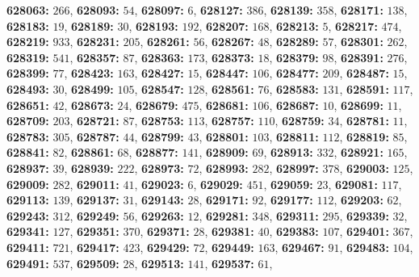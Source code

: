 \textsf{\bfseries 628063:} $266$, \textsf{\bfseries 628093:} $54$, \textsf{\bfseries 628097:} $6$, \textsf{\bfseries 628127:} $386$, \textsf{\bfseries 628139:} $358$, \textsf{\bfseries 628171:} $138$, \textsf{\bfseries 628183:} $19$, \textsf{\bfseries 628189:} $30$, \textsf{\bfseries 628193:} $192$, \textsf{\bfseries 628207:} $168$, \textsf{\bfseries 628213:} $5$, \textsf{\bfseries 628217:} $474$, \textsf{\bfseries 628219:} $933$, \textsf{\bfseries 628231:} $205$, \textsf{\bfseries 628261:} $56$, \textsf{\bfseries 628267:} $48$, \textsf{\bfseries 628289:} $57$, \textsf{\bfseries 628301:} $262$, \textsf{\bfseries 628319:} $541$, \textsf{\bfseries 628357:} $87$, \textsf{\bfseries 628363:} $173$, \textsf{\bfseries 628373:} $18$, \textsf{\bfseries 628379:} $98$, \textsf{\bfseries 628391:} $276$, \textsf{\bfseries 628399:} $77$, \textsf{\bfseries 628423:} $163$, \textsf{\bfseries 628427:} $15$, \textsf{\bfseries 628447:} $106$, \textsf{\bfseries 628477:} $209$, \textsf{\bfseries 628487:} $15$, \textsf{\bfseries 628493:} $30$, \textsf{\bfseries 628499:} $105$, \textsf{\bfseries 628547:} $128$, \textsf{\bfseries 628561:} $76$, \textsf{\bfseries 628583:} $131$, \textsf{\bfseries 628591:} $117$, \textsf{\bfseries 628651:} $42$, \textsf{\bfseries 628673:} $24$, \textsf{\bfseries 628679:} $475$, \textsf{\bfseries 628681:} $106$, \textsf{\bfseries 628687:} $10$, \textsf{\bfseries 628699:} $11$, \textsf{\bfseries 628709:} $203$, \textsf{\bfseries 628721:} $87$, \textsf{\bfseries 628753:} $113$, \textsf{\bfseries 628757:} $110$, \textsf{\bfseries 628759:} $34$, \textsf{\bfseries 628781:} $11$, \textsf{\bfseries 628783:} $305$, \textsf{\bfseries 628787:} $44$, \textsf{\bfseries 628799:} $43$, \textsf{\bfseries 628801:} $103$, \textsf{\bfseries 628811:} $112$, \textsf{\bfseries 628819:} $85$, \textsf{\bfseries 628841:} $82$, \textsf{\bfseries 628861:} $68$, \textsf{\bfseries 628877:} $141$, \textsf{\bfseries 628909:} $69$, \textsf{\bfseries 628913:} $332$, \textsf{\bfseries 628921:} $165$, \textsf{\bfseries 628937:} $39$, \textsf{\bfseries 628939:} $222$, \textsf{\bfseries 628973:} $72$, \textsf{\bfseries 628993:} $282$, \textsf{\bfseries 628997:} $378$, \textsf{\bfseries 629003:} $125$, \textsf{\bfseries 629009:} $282$, \textsf{\bfseries 629011:} $41$, \textsf{\bfseries 629023:} $6$, \textsf{\bfseries 629029:} $451$, \textsf{\bfseries 629059:} $23$, \textsf{\bfseries 629081:} $117$, \textsf{\bfseries 629113:} $139$, \textsf{\bfseries 629137:} $31$, \textsf{\bfseries 629143:} $28$, \textsf{\bfseries 629171:} $92$, \textsf{\bfseries 629177:} $112$, \textsf{\bfseries 629203:} $62$, \textsf{\bfseries 629243:} $312$, \textsf{\bfseries 629249:} $56$, \textsf{\bfseries 629263:} $12$, \textsf{\bfseries 629281:} $348$, \textsf{\bfseries 629311:} $295$, \textsf{\bfseries 629339:} $32$, \textsf{\bfseries 629341:} $127$, \textsf{\bfseries 629351:} $370$, \textsf{\bfseries 629371:} $28$, \textsf{\bfseries 629381:} $40$, \textsf{\bfseries 629383:} $107$, \textsf{\bfseries 629401:} $367$, \textsf{\bfseries 629411:} $721$, \textsf{\bfseries 629417:} $423$, \textsf{\bfseries 629429:} $72$, \textsf{\bfseries 629449:} $163$, \textsf{\bfseries 629467:} $91$, \textsf{\bfseries 629483:} $104$, \textsf{\bfseries 629491:} $537$, \textsf{\bfseries 629509:} $28$, \textsf{\bfseries 629513:} $141$, \textsf{\bfseries 629537:} $61$, 

